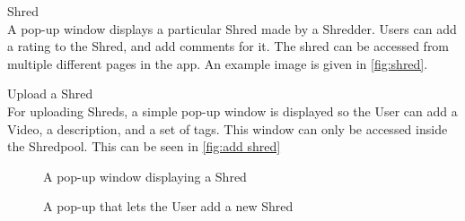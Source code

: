 \begin{description}
\item{Shred} \hfill \\
A pop-up window displays a particular Shred made by a Shredder. Users can add a rating to the Shred, and add comments for it. The shred can be accessed from multiple different pages in the app. An example image is given in \vref{fig:shred}.

\item{Upload a Shred} \hfill \\
For uploading Shreds, a simple pop-up window is displayed so the User can add a Video, a description, and a set of tags. This window can only be accessed inside the Shredpool. This can be seen in \vref{fig:add shred}

\begin{figure}
  \begin{center}
\end{center}
\caption{A pop-up window displaying a Shred}\label{fig:shred}
\end{figure}


\begin{figure}
  \begin{center}
\end{center}
\caption{A pop-up that lets the User add a new Shred}\label{fig:addshred}
\end{figure}

\end{description}
		
